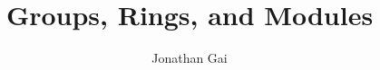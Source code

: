 
\usepackage{bbm}
\usepackage{nicefrac}
\author{Jonathan Gai}
\title{Groups, Rings, and Modules}


\maketitle
\tableofcontents
{}
